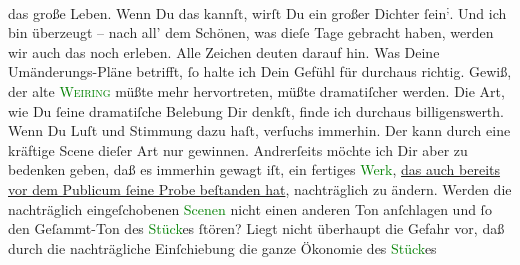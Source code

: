                das große Leben. Wenn Du das kannſt, wirſt Du ein großer Dichter ſein\substVorne{}\textsuperscript{;}\substDazwischen{}.\substHinten{} Und ich bin überzeugt –  nach all’ dem
               Schönen, was dieſe {\pb}Tage gebracht haben, werden wir
               auch das noch  erleben. Alle Zeichen deuten darauf
               hin.\pend
           \pstart
           Was Deine Umänderungs-Pläne betrifft, ſo halte ich Dein Gefühl für durchaus richtig.
               Gewiß, der alte \textsc{\textcolor{green}{Weiring}{}} müßte mehr hervortreten, müßte dramatiſcher werden. Die Art, wie Du ſeine
               dramatiſche  Belebung Dir denkſt, finde ich {\pb}durchaus  billigenswerth. Wenn Du Luſt und Stimmung dazu haſt,
               verſuchs immerhin. Der \label{K_L02753-2v}\label{K_L02753-2h} kann durch eine kräftige  Scene dieſer Art nur gewinnen. Andrerſeits möchte ich Dir aber zu bedenken
               geben, daß es immerhin gewagt iſt, ein fertiges \textcolor{green}{Werk}{}, \uline{das auch bereits vor dem
                  Publicum ſeine Probe beſtanden hat}, nachträglich zu ändern. Werden die
               nachträglich {\pb}eingeſchobenen \textcolor{green}{Scenen}{} nicht einen anderen Ton anſchlagen
               und ſo den Geſammt-Ton des \textcolor{green}{Stück}{}es ſtören? Liegt nicht überhaupt die Gefahr  vor, daß durch die nachträgliche Einſchiebung die ganze  Ökonomie des \textcolor{green}{Stück}{}es
